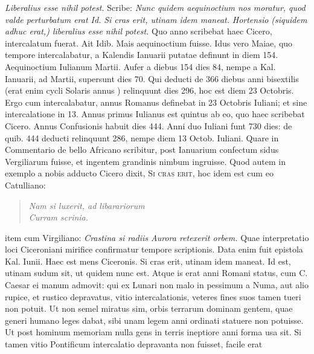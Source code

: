 \textit{Liberalius esse nihil potest.}
%
Scribe: \textit{Nunc quidem aequinoctium nos moratur,
 quod valde perturbatum
erat Id.}
\textit{Si cras erit, utinam idem maneat.}
\textit{Hortensio (siquidem
adhuc erat,) liberalius esse nihil potest.}
Quo anno scribebat haec
Cicero, intercalatum fuerat.
Ait Idib. %
Mais aequinoctium fuisse.
Idus
vero Maiae, quo tempore intercalabatur, a Kalendis Ianuarii putatae
definunt in diem 154.
Aequinoctium Iulianum  Martii.
Aufer
a diebus 154 dies 84, nempe a Kal. Ianuarii, %
 ad  Martii, supersunt
dies 70.
Qui deducti de 366 diebus anni bisextilis (erat enim cycli
Solaris annus ) relinquunt dies 296, hoc est diem 23 Octobris.
Ergo cum intercalabatur, annus Romanus definebat in 23
Octobris Iuliani; et sine intercalatione in 13.
Annus primus Iulianus
est quintus ab eo, quo haec scribebat Cicero.
Annus Confusionis
habuit dies 444.
Anni duo Iuliani funt 730 dies: de quib. %
444 deducti relinquunt 286, nempe diem 13 Octob. Iuliani. %
Quare in Commentario de bello Africano scribitur, post Ianuarium
confectum sidus Vergiliarum fuisse, et ingentem grandinis nimbum
ingruisse.
Quod autem in exemplo a nobis adducto Cicero dixit, \textsc{Si
cras erit}, hoc idem est cum eo Catulliano:
\begin{verse}
\textit{Nam si luxerit, ad libarariorum\\
Curram scrinia. \emd{}}
\end{verse}
item cum Virgiliano: \textit{Crastina si radiis Aurora retexerit orbem.}
Quae interpretatio loci Ciceroniani mirifice confirmatur tempore
scriptionis.
Data enim fuit epistola  Kal. Iunii. %
Haec est mens
Ciceronis.
Si cras erit, utinam idem maneat.
Id est, utinam sudum sit,
ut quidem nunc est.
Atque is erat anni Romani status, cum C. Caesar
ei manum admovit: qui ex Lunari non malo in pessimum a Numa,
aut alio rupice, et rustico depravatus, vitio intercalationis, veteres
fines suos tamen tueri non potuit.
Ut non semel miratus sim,
orbis terrarum dominam gentem, quae generi humano leges dabat,
sibi unam legem anni ordinati statuere non potuisse.
Ut post hominum
memoriam nulla gens in terris ineptiore anni forma usa sit.
Si
tamen vitio Pontificum intercalatio depravanta non fuisset, facile erat
